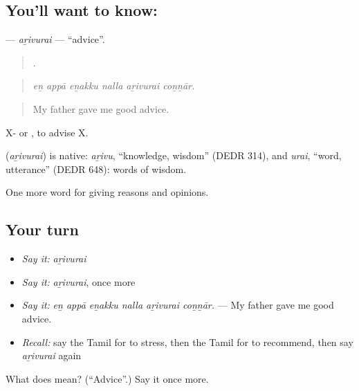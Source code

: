 \subsection*{You'll want to know: }
\textbf{} — \emph{aṟivurai} — \textquotedblleft{}advice\textquotedblright{}.

\begin{quote}
     .
\end{quote}

\begin{quote}
\emph{eṉ appā eṉakku nalla aṟivurai coṉṉār.}
\end{quote}

\begin{quote}
My father gave me good advice.
\end{quote}

X-   or , to advise X.

\begin{cousinweb}
\textbf{} (\emph{aṟivurai}) is native: \emph{aṟivu}, \textquotedblleft{}knowledge, wisdom\textquotedblright{} (DEDR 314), and \emph{urai}, \textquotedblleft{}word, utterance\textquotedblright{} (DEDR 648): words of wisdom.
\end{cousinweb}

\begin{grammarlens}[title={What you've built}]
One more word for giving reasons and opinions.
\end{grammarlens}

\subsection*{Your turn}
\begin{itemize}
\raggedright
  \item \emph{Say it:} \emph{aṟivurai}
  \item \emph{Say it:} \emph{aṟivurai}, once more
  \item \emph{Say it:} \emph{eṉ appā eṉakku nalla aṟivurai coṉṉār.} — My father gave me good advice.
  \item \emph{Recall:} say the Tamil for to stress, then the Tamil for to recommend, then say \emph{aṟivurai} again
\end{itemize}

\begin{tcolorbox}[breakable,colback=teal!4,colframe=teal!35!black,title={Before you move on}]
What does  mean? (\textquotedblleft{}Advice\textquotedblright{}.) Say it once more.
\end{tcolorbox}
